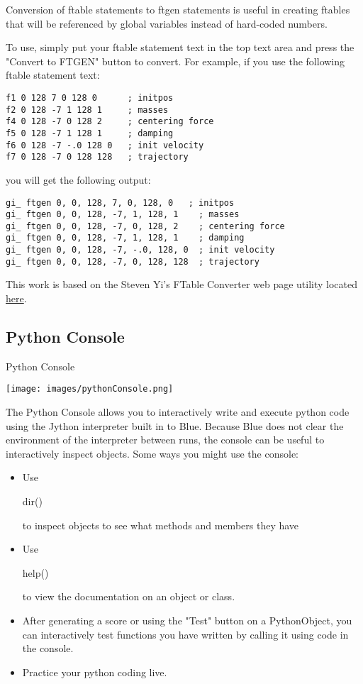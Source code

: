 Conversion of ftable statements to ftgen statements is useful in
creating ftables that will be referenced by global variables instead of
hard-coded numbers.

To use, simply put your ftable statement text in the top text area and
press the "Convert to FTGEN" button to convert. For example, if you use
the following ftable statement text:

\begin{verbatim}
f1 0 128 7 0 128 0      ; initpos
f2 0 128 -7 1 128 1     ; masses
f4 0 128 -7 0 128 2     ; centering force
f5 0 128 -7 1 128 1     ; damping
f6 0 128 -7 -.0 128 0   ; init velocity
f7 0 128 -7 0 128 128   ; trajectory
\end{verbatim}

you will get the following output:

\begin{verbatim}
gi_ ftgen 0, 0, 128, 7, 0, 128, 0   ; initpos
gi_ ftgen 0, 0, 128, -7, 1, 128, 1    ; masses
gi_ ftgen 0, 0, 128, -7, 0, 128, 2    ; centering force
gi_ ftgen 0, 0, 128, -7, 1, 128, 1    ; damping
gi_ ftgen 0, 0, 128, -7, -.0, 128, 0  ; init velocity
gi_ ftgen 0, 0, 128, -7, 0, 128, 128  ; trajectory
\end{verbatim}

This work is based on the Steven Yi's FTable Converter web page utility
located \href{http://www.csounds.com/stevenyi/ftable.html}{here}.

\subsection{Python Console}\label{pythonConsole}

Python Console

\texttt{[image: images/pythonConsole.png]}

The Python Console allows you to interactively write and execute python
code using the Jython interpreter built in to Blue. Because Blue does
not clear the environment of the interpreter between runs, the console
can be useful to interactively inspect objects. Some ways you might use
the console:

\begin{itemize}
\tightlist
\item
  Use

  dir()

  to inspect objects to see what methods and members they have
\item
  Use

  help()

  to view the documentation on an object or class.
\item
  After generating a score or using the "Test" button on a PythonObject,
  you can interactively test functions you have written by calling it
  using code in the console.
\item
  Practice your python coding live.
\end{itemize}

